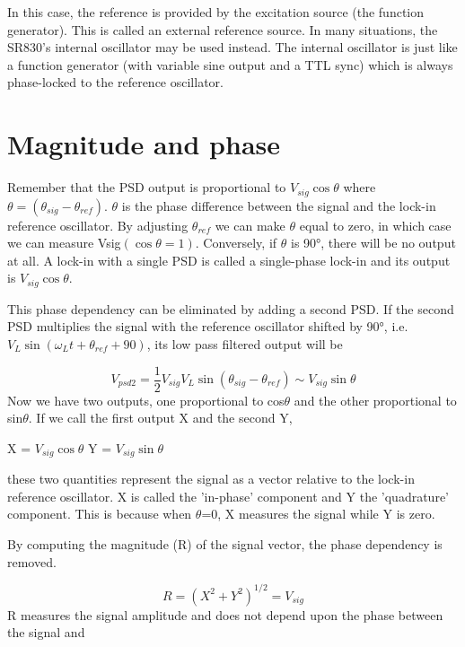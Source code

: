 \documentclass{../lab}
\begin{document}
In this case, the reference is provided by the excitation source (the function generator). This is called an external reference source. In many situations, the SR830's internal oscillator may be used instead. The internal oscillator is just like a function generator (with variable sine output and a TTL sync) which is always phase-locked to the reference oscillator.

\section{Magnitude and phase}

Remember that the PSD output is proportional to $ V_{sig} \cos \theta $ where $ \theta = \left ( \theta_{sig} - \theta_{ref} \right ) $. $ \theta $ is the phase difference between the signal and the lock-in reference oscillator. By adjusting $ \theta_{ref} $ we can make $ \theta $ equal to zero, in which case we can measure Vsig$ \left ( \cos \theta = 1 \right) $. Conversely, if $ \theta $ is 90°, there will be no output at all. A lock-in with a single PSD is called a single-phase lock-in and its output is $ V_{sig} \cos \theta $.

This phase dependency can be eliminated by adding a second PSD. If the second PSD multiplies the signal with the reference oscillator shifted by 90°, i.e. $ V_L \sin \left ( \omega_Lt + \theta_{ref} + 90 \right ) $, its low pass filtered output will be

\begin{equation}
    V_{psd2} = \frac {1}{2} V_{sig} V_L \sin \left ( \theta_{sig} - \theta_{ref} \right) \sim V_{sig} \sin \theta
\end{equation}
Now we have two outputs, one proportional to cos$ \theta $ and the other proportional to sin$ \theta $. If we call the first output X and the second Y,

X = $ V_{sig} \cos \theta $ Y = $  V_{sig} \sin \theta $

these two quantities represent the signal as a vector relative to the lock-in reference oscillator. X is called the 'in-phase' component and Y the 'quadrature' component. This is because when $ \theta $=0, X measures the signal while Y is zero.

By computing the magnitude (R) of the signal vector, the phase dependency is removed.

\begin{equation}
    R = \left ( X^2 + Y^2 \right )^{1/2} = V_{sig}
\end{equation}
R measures the signal amplitude and does not depend upon the phase between the signal and
\end{document}
